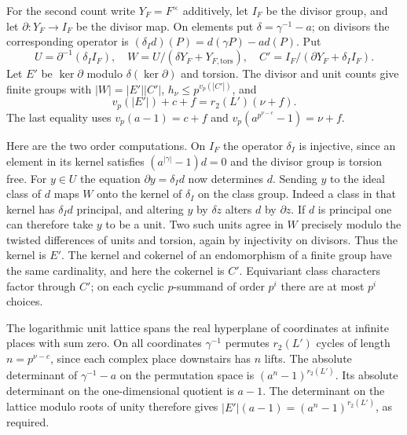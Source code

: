 

For the second count write $Y_F=F^\times$ additively, let $I_F$ be the
divisor group, and let $\partial:Y_F\to I_F$ be the divisor map.
On elements put $\delta=\gamma^{-1}-a$; on divisors the corresponding
operator is $(\delta_I d)(P)=d(\gamma P)-a d(P)$. Put
\[
 U=\partial^{-1}(\delta_I I_F),\quad
 W=U/(\delta Y_F+Y_{F,\mathrm{tors}}),\quad
 C'=I_F/(\partial Y_F+\delta_I I_F).
\]
Let $E'$ be $\ker\partial$ modulo $\delta(\ker\partial)$ and torsion.
The divisor and unit counts give finite groups with $|W|=|E'||C'|$,
$h_\nu\le p^{v_p(|C'|)}$, and
\[
 v_p(|E'|)+c+f=r_2(L')(\nu+f).
\]
The last equality uses $v_p(a-1)=c+f$ and
$v_p(a^{p^{\nu-c}}-1)=\nu+f$.

Here are the two order computations. On $I_F$ the operator $\delta_I$
is injective, since an element in its kernel satisfies
$(a^{|\gamma|}-1)d=0$ and the divisor group is torsion free.
For $y\in U$ the equation $\partial y=\delta_I d$ now determines $d$.
Sending $y$ to the ideal class of $d$ maps $W$ onto the kernel of
$\delta_I$ on the class group. Indeed a class in that kernel has
$\delta_I d$ principal, and altering $y$ by $\delta z$ alters $d$ by
$\partial z$. If $d$ is principal one can therefore take $y$ to be
a unit. Two such units agree in $W$ precisely modulo the twisted
differences of units and torsion, again by injectivity on divisors.
Thus the kernel is $E'$. The kernel and cokernel of an endomorphism
of a finite group have the same cardinality, and here the cokernel
is $C'$. Equivariant class characters factor through $C'$; on each
cyclic $p$-summand of order $p^i$ there are at most $p^i$ choices.

The logarithmic unit lattice spans the real hyperplane of coordinates
at infinite places with sum zero. On all coordinates $\gamma^{-1}$
permutes $r_2(L')$ cycles of length $n=p^{\nu-c}$, since each complex
place downstairs has $n$ lifts. The absolute determinant of
$\gamma^{-1}-a$ on the permutation space is $(a^n-1)^{r_2(L')}$.
Its absolute determinant on the one-dimensional quotient is $a-1$.
The determinant on the lattice modulo roots of unity therefore gives
$|E'|(a-1)=(a^n-1)^{r_2(L')}$, as required.

